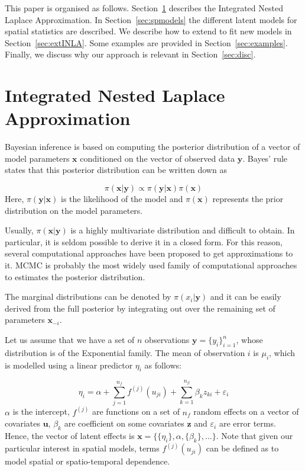\documentclass[article]{jss}
\begin{document}
This paper is organised as follows. Section~\ref{sec:INLA} describes the
Integrated Nested Laplace Approximation.  In Section~\ref{sec:spmodels} the
different latent models for spatial statistics are described.  We describe how
to extend  to fit new models in Section~\ref{sec:extINLA}. Some
examples are provided in Section~\ref{sec:examples}.  Finally, we discuss why
our approach is relevant in Section~\ref{sec:disc}.

\section{Integrated Nested Laplace Approximation}
\label{sec:INLA}

Bayesian inference is based on computing the posterior distribution of a
vector of model parameters $\mathbf{x}$ conditioned on the vector of observed
data $\mathbf{y}$. Bayes' rule states that this posterior distribution
can be written down as

$$
\pi(\mathbf{x}|\mathbf{y}) \propto \pi(\mathbf{y}|\mathbf{x}) \pi(\mathbf{x})
$$
\noindent
Here, $\pi(\mathbf{y}|\mathbf{x})$ is the likelihood of the model and
$\pi(\mathbf{x})$ represents the prior distribution on the model parameters.


Usually, $\pi(\mathbf{x}|\mathbf{y})$ is a highly multivariate distribution
and difficult to obtain. In particular, it is seldom possible to derive it in
a closed form. For this reason, several computational approaches  have been 
proposed to get approximations to it. MCMC is probably the most widely used
family of computational approaches to estimates the posterior distribution.

The marginal distributions can be denoted by $\pi(x_i|\mathbf{y})$
and it can be easily derived from the full posterior by integrating
out over the remaining set of parameters $\mathbf{x}_{-i}$.

Let us assume that we have a set of $n$ observations 
$\mathbf{y}=\{y_i\}_ {i=1}^n$, whose distribution is of the Exponential family.
The mean of observation $i$ is $\mu_i$, which is modelled using a linear
predictor $\eta_i$ as follows:

$$
\eta_i=\alpha+\sum_{j=1}^{n_f} f^{(j)}(u_{ji})+\sum_{k=1}^{n_{\beta}}\beta_k z_{ki}+\varepsilon_i
$$
\noindent
$\alpha$ is the intercept, $f^{(j)}$ are functions on a set of $n_f$ random
effects on a vector of covariates $\mathbf{u}$, $\beta_k$ are coefficient on
some covariates $\mathbf{z}$ and $\varepsilon_i$ are error terms. Hence, the
vector of latent effects is $\mathbf{x}=\{\{\eta_i\}, \alpha, \{\beta_k\},
\ldots\}$. Note that given our particular interest in spatial models, terms
$f^{(j)}(u_{ji})$ can be defined as to model spatial or spatio-temporal
dependence.
\end{document}

